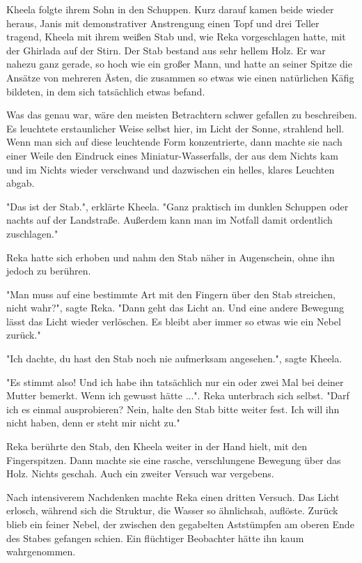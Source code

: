 \documentclass[10pt, a4paper, oneside]{book}
\begin{document}
\begin{multicols}{2}
Kheela folgte ihrem Sohn in den Schuppen. Kurz darauf kamen beide wieder heraus, Janis mit demonstrativer Anstrengung einen Topf und drei Teller tragend, Kheela mit ihrem weißen Stab und, wie Reka vorgeschlagen hatte, mit der Ghirlada auf der Stirn. Der Stab bestand aus sehr hellem Holz. Er war nahezu ganz gerade, so hoch wie ein großer Mann, und hatte an seiner Spitze die Ansätze von mehreren Ästen, die zusammen so etwas wie einen natürlichen Käfig bildeten, in dem sich tatsächlich etwas befand. 

Was das genau war, wäre den meisten Betrachtern schwer gefallen zu beschreiben. Es leuchtete erstaunlicher Weise selbst hier, im Licht der Sonne, strahlend hell. Wenn man sich auf diese leuchtende Form konzentrierte, dann machte sie nach einer Weile den Eindruck eines Miniatur-Wasserfalls, der aus dem Nichts kam und im Nichts wieder verschwand und dazwischen ein helles, klares Leuchten abgab. 

"Das ist der Stab.", erklärte Kheela. "Ganz praktisch im dunklen Schuppen oder nachts auf der Landstraße. Außerdem kann man im Notfall damit ordentlich zuschlagen." 

Reka hatte sich erhoben und nahm den Stab näher in Augenschein, ohne ihn jedoch zu berühren. 

"Man muss auf eine bestimmte Art mit den Fingern über den Stab streichen, nicht wahr?", sagte Reka. "Dann geht das Licht an. Und eine andere Bewegung lässt das Licht wieder verlöschen. Es bleibt aber immer so etwas wie ein Nebel zurück." 

"Ich dachte, du hast den Stab noch nie aufmerksam angesehen.", sagte Kheela. 

"Es stimmt also! Und ich habe ihn tatsächlich nur ein oder zwei Mal bei deiner Mutter bemerkt. Wenn ich gewusst hätte ...". Reka unterbrach sich selbst. "Darf ich es einmal ausprobieren? Nein, halte den Stab bitte weiter fest. Ich will ihn nicht haben, denn er steht mir nicht zu." 

Reka berührte den Stab, den Kheela weiter in der Hand hielt, mit den Fingerspitzen. Dann machte sie eine rasche, verschlungene Bewegung über das Holz. Nichts geschah. Auch ein zweiter Versuch war vergebens. 

Nach intensiverem Nachdenken machte Reka einen dritten Versuch. Das Licht erlosch, während sich die Struktur, die Wasser so ähnlichsah, auflöste. Zurück blieb ein feiner Nebel, der zwischen den gegabelten Aststümpfen am oberen Ende des Stabes gefangen schien. Ein flüchtiger Beobachter hätte ihn kaum wahrgenommen. 


\end{multicols}
\end{document}
